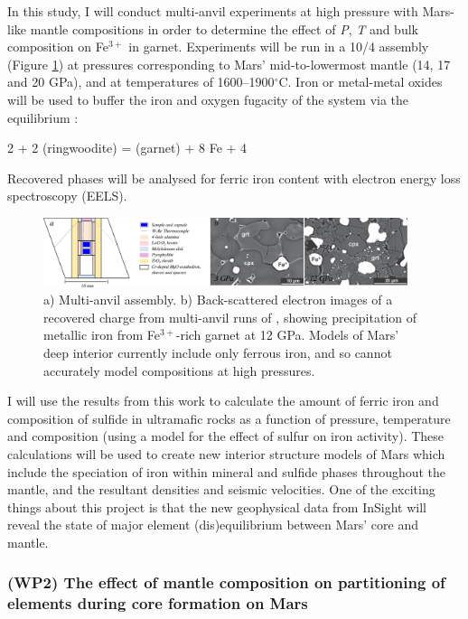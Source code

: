 \documentclass[11pt,twoside,a4paper]{article}
\begin{document}
In this study, I will conduct multi-anvil experiments at high pressure with Mars-like mantle compositions in order to determine the effect of \emph{P}, \emph{T} and bulk composition on Fe$^{3+}$ in garnet. Experiments will be run in a 10/4 assembly (Figure \ref{fig:iron_expts}) at pressures corresponding to Mars' mid-to-lowermost mantle (14, 17 and 20 GPa), and at temperatures of 1600--1900$^{\circ}$C. Iron or metal-metal oxides will be used to buffer the iron and oxygen fugacity of the system via the equilibrium \citep{SOMF2013}:
\begin{reaction}
 2  + 2 (ringwoodite) =  (garnet) + 8 Fe + 4 
\end{reaction}
Recovered phases will be analysed for ferric iron content with electron energy loss spectroscopy (EELS). 

\begin{figure}[!ht]
  \centering
  \includegraphics[width=0.95\textwidth]{figures/autoredox}
  \caption{a) Multi-anvil assembly. b) Back-scattered electron images of a recovered charge from multi-anvil runs of \cite{Rohrbachetal2007}, showing precipitation of metallic iron from Fe$^{3+}$-rich garnet at 12 GPa. Models of Mars' deep interior currently include only ferrous iron, and so cannot accurately model compositions at high pressures.}
  \label{fig:iron_expts}
\end{figure}

I will use the results from this work to calculate the amount of ferric iron and composition of sulfide in ultramafic rocks as a function of pressure, temperature and composition (using a model for the effect of sulfur on iron activity). These calculations will be used to create new interior structure models of Mars which include the speciation of iron within mineral and sulfide phases throughout the mantle, and the resultant densities and seismic velocities. One of the exciting things about this project is that the new geophysical data from InSight will reveal the state of major element (dis)equilibrium between Mars' core and mantle.

\subsubsection*{(WP2) The effect of mantle composition on partitioning of elements during core formation on Mars}
\end{document}
